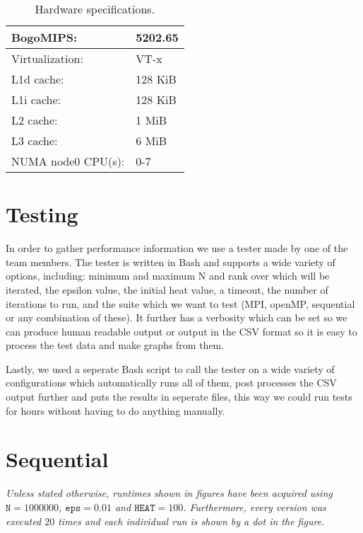 \documentclass[a4paper]{article}
\begin{document}
\begin{table}[h]
\begin{tabular}{|l|l|}
        BogoMIPS:            &    5202.65\\\hline
        Virtualization:      &    VT-x\\\hline
        L1d cache:           &    128 KiB\\\hline
        L1i cache:           &    128 KiB\\\hline
        L2 cache:            &    1 MiB\\\hline
        L3 cache:            &    6 MiB\\\hline
        NUMA node0 CPU(s):   &    0-7\\
        \hline
    \end{tabular}
    \caption{Hardware specifications.}
    \label{tab: hardware}
\end{table}

\section{Testing}
In order to gather performance information we use a tester made by one of the team members. The tester is written in Bash and supports a wide variety of options, including: minimum and maximum N and rank over which will be iterated, the epsilon value, the initial heat value, a timeout, the number of iterations to run, and the suite which we want to test (MPI, openMP, sequential or any combination of these). It further has a verbosity which can be set so we can produce human readable output or output in the CSV format so it is easy to process the test data and make graphs from them.

Lastly, we used a seperate Bash script to call the tester on a wide variety of configurations which automatically runs all of them, post processes the CSV output further and puts the results in seperate files, this way we could run tests for hours without having to do anything manually.

    
\section{Sequential}
\textit{Unless stated otherwise, runtimes shown in figures have been acquired using $\texttt{N} = 1000000$, $\texttt{eps} = 0.01$ and $\texttt{HEAT} = 100$. Furthermore, every version was executed $20$ times and each individual run is shown by a dot in the figure.}\\
\end{document}
